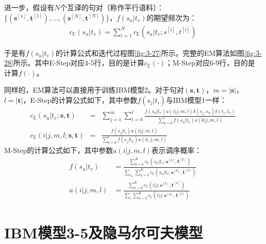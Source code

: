 \noindent \hspace{2em} 进一步，假设有$N$个互译的句对（称作平行语料）：
$\{(\mathbf{s}^{[1]},\mathbf{t}^{[1]}),...,(\mathbf{s}^{[N]},\mathbf{t}^{[N]})\}$，$f(s_u|t_v)$的期望频次为：
\begin{eqnarray}
c_{\mathbb{E}}(s_u|t_v)=\sum\limits_{i=1}^{N}  c_{\mathbb{E}}(s_u|t_v;s^{[i]},t^{[i]})
\label{eq:3-46}
\end{eqnarray}

\noindent \hspace{2em}  于是有$f(s_u|t_v)$的计算公式和迭代过程图\ref{fig:3-27}所示。完整的EM算法如图\ref{fig:3-28}所示。其中E-Step对应4-5行，目的是计算$c_{\mathbb{E}}(\cdot)$；M-Step对应6-9行，目的是计算$f(\cdot)$。
\vspace{-1.5em}

\noindent \hspace{2em}  同样的，EM算法可以直接用于训练IBM模型2。对于句对$(\mathbf{s},\mathbf{t})$，$m=|\mathbf{s}|$，$l=|\mathbf{t}|$，E-Step的计算公式如下，其中参数$f(s_j|t_i)$与IBM模型1一样：
\begin{eqnarray}
c_{\mathbb{E}}(s_u|t_v;\mathbf{s},\mathbf{t}) &=&\sum\limits_{j=1}^{m} \sum\limits_{i=0}^{l} \frac{f(s_u|t_v)a(i|j,m,l) \delta(s_j,s_u)\delta (t_i,t_v) }   {\sum_{k=0}^{l} f(s_u|t_k)a(k|j,m,l)} \\
c_{\mathbb{E}}(i|j,m,l;\mathbf{s},\mathbf{t}) &=&\frac{f(s_j|t_i)a(i|j,m,l)}   {\sum_{k=0}^{l} f(s_j|t_k)a(k,j,m,l)}
\label{eq:3-47}
\end{eqnarray}
\noindent \hspace{2em}  M-Step的计算公式如下，其中参数$a(i|j,m,l)$表示调序概率：
\begin{eqnarray}
f(s_u|t_v) &=\frac{\sum_{k=0}^{K}c_{\mathbb{E}}(s_u|t_v;\mathbf{s}^{[k]},\mathbf{t}^{[k]}) }    {\sum_{s_u} \sum_{k=0}^{K} c_{\mathbb{E}}(s_u|t_v;\mathbf{s}^{[k]},\mathbf{t}^{[k]})} \\
a(i|j,m,l) &=\frac{\sum_{k=0}^{K}c_{\mathbb{E}}(i|j;\mathbf{s}^{[k]},\mathbf{t}^{[k]})}  {\sum_{i}\sum_{k=0}^{K}c_{\mathbb{E}}(i|j;\mathbf{s}^{[k]},\mathbf{t}^{[k]})}
\label{eq:3-48}
\end{eqnarray}


\sectionnewpage
\section{IBM模型3-5及隐马尔可夫模型}

